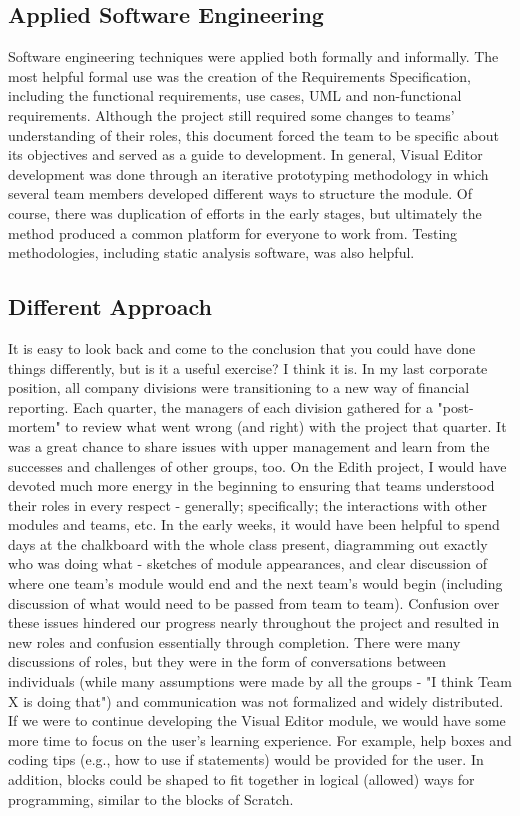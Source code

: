 \documentclass[a4paper]{article}
\begin{document}
	\subsection{Applied Software Engineering}
	Software engineering techniques were applied both formally and informally.  The most helpful formal use was the creation of the Requirements Specification, including the functional requirements, use cases, UML and non-functional requirements.  Although the project still required some changes to teams' understanding of their roles, this document forced the team to be specific about its objectives and served as a guide to development.  In general, Visual Editor development was done through an iterative prototyping methodology in which several team members developed different ways to structure the module.  Of course, there was duplication of efforts in the early stages, but ultimately the method produced a common platform for everyone to work from.  Testing methodologies, including static analysis software, was also helpful.  
	        
	
	\subsection{Different Approach}
	It is easy to look back and come to the conclusion that you could have done things differently, but is it a useful exercise?  I think it is.  In my last corporate position, all company divisions were transitioning to a new way of financial reporting.  Each quarter, the managers of each division gathered for a "post-mortem" to review what went wrong (and right) with the project that quarter.  It was a great chance to share issues with upper management and learn from the successes and challenges of other groups, too.  On the Edith project, I would have devoted much more energy in the beginning to ensuring that teams understood their roles in every respect - generally; specifically; the interactions with other modules and teams, etc.  In the early weeks, it would have been helpful to spend days at the chalkboard with the whole class present, diagramming out exactly who was doing what - sketches of module appearances, and clear discussion of where one team's module would end and the next team's would begin (including discussion of what would need to be passed from team to team).  Confusion over these issues hindered our progress nearly throughout the project and resulted in new roles and confusion essentially through completion.  There were many discussions of roles, but they were in the form of conversations between individuals (while many assumptions were made by all the groups - "I think Team X is doing that") and communication was not formalized and widely distributed. If we were to continue developing the Visual Editor module, we would have some more time to focus on the user's learning experience.  For example, help boxes and coding tips (e.g., how to use if statements) would be provided for the user.  In addition, blocks could be shaped to fit together in logical (allowed) ways for programming, similar to the blocks of Scratch.  
	        
\end{document}
